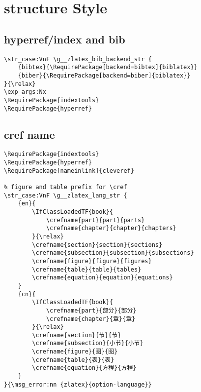 \section{structure Style}
\subsection{hyperref/index and bib}
\begin{verbatim}
\str_case:VnF \g__zlatex_bib_backend_str {
    {bibtex}{\RequirePackage[backend=bibtex]{biblatex}}
    {biber}{\RequirePackage[backend=biber]{biblatex}}
}{\relax}
\exp_args:Nx 
\RequirePackage{indextools}
\RequirePackage{hyperref}
\end{verbatim}

\subsection{cref name}
\begin{verbatim}
\RequirePackage{indextools}
\RequirePackage{hyperref}
\RequirePackage[nameinlink]{cleveref}

% figure and table prefix for \cref 
\str_case:VnF \g__zlatex_lang_str {
    {en}{
        \IfClassLoadedTF{book}{
            \crefname{part}{part}{parts}
            \crefname{chapter}{chapter}{chapters}
        }{\relax}
        \crefname{section}{section}{sections}
        \crefname{subsection}{subsection}{subsections}
        \crefname{figure}{figure}{figures}
        \crefname{table}{table}{tables}
        \crefname{equation}{equation}{equations}
    }
    {cn}{
        \IfClassLoadedTF{book}{
            \crefname{part}{部分}{部分}
            \crefname{chapter}{章}{章}
        }{\relax}
        \crefname{section}{节}{节}
        \crefname{subsection}{小节}{小节}
        \crefname{figure}{图}{图}
        \crefname{table}{表}{表}
        \crefname{equation}{方程}{方程}
    }
}{\msg_error:nn {zlatex}{option-language}}    
\end{verbatim}

